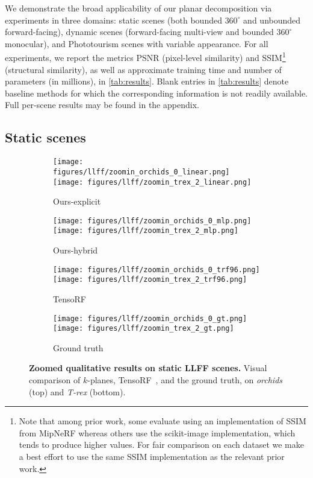 \documentclass[10pt,twocolumn,letterpaper]{article}
\newcommand{\modelname}{$k$-planes}
\begin{document}
We demonstrate the broad applicability of our planar decomposition via experiments in three domains: static scenes (both bounded $360^{\circ}$ and unbounded forward-facing), dynamic scenes (forward-facing multi-view and bounded $360^{\circ}$ monocular), and Phototourism scenes with variable appearance. For all experiments, we report the metrics PSNR (pixel-level similarity) and SSIM\footnote{Note that among prior work, some evaluate using an implementation of SSIM from MipNeRF \cite{mipnerf} whereas others use the scikit-image implementation, which tends to produce higher values. For fair comparison on each dataset we make a best effort to use the same SSIM implementation as the relevant prior work.}~\cite{ssim} (structural similarity), as well as approximate training time and number of parameters (in millions), in \cref{tab:results}. Blank entries in \cref{tab:results} denote baseline methods for which the corresponding information is not readily available. Full per-scene results may be found in the appendix.

\subsection{Static scenes}\label{sec:static}


\begin{figure}[t]
  \centering
  \begin{subfigure}[b]{0.24\linewidth}
    \texttt{[image: figures/llff/zoomin\_orchids\_0\_linear.png]}
    \texttt{[image: figures/llff/zoomin\_trex\_2\_linear.png]}
    \caption{Ours-explicit}
  \end{subfigure}
  \begin{subfigure}[b]{0.24\linewidth}
    \texttt{[image: figures/llff/zoomin\_orchids\_0\_mlp.png]}
    \texttt{[image: figures/llff/zoomin\_trex\_2\_mlp.png]}
    \caption{Ours-hybrid}
  \end{subfigure}
  \begin{subfigure}[b]{0.24\linewidth}
    \texttt{[image: figures/llff/zoomin\_orchids\_0\_trf96.png]}
    \texttt{[image: figures/llff/zoomin\_trex\_2\_trf96.png]}
    \caption{TensoRF}
  \end{subfigure}
  \begin{subfigure}[b]{0.24\linewidth}
    \texttt{[image: figures/llff/zoomin\_orchids\_0\_gt.png]}
    \texttt{[image: figures/llff/zoomin\_trex\_2\_gt.png]}
    \caption{Ground truth}
  \end{subfigure}
  \caption{\textbf{Zoomed qualitative results on static LLFF scenes.} Visual comparison of \modelname{}, TensoRF~\cite{tensorf}, and the ground truth, on \emph{orchids} (top) and \emph{T-rex} (bottom).}
  \label{fig:llff-zoom}
\end{figure}
\end{document}
